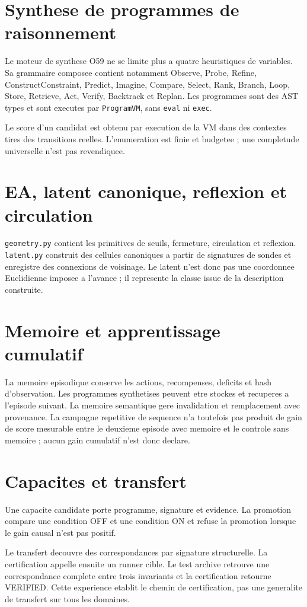 \documentclass[11pt,a4paper]{article}
\begin{document}
\section{Synthese de programmes de raisonnement}
Le moteur de synthese O59 ne se limite plus a quatre heuristiques de variables. Sa grammaire composee contient notamment Observe, Probe, Refine, ConstructConstraint, Predict, Imagine, Compare, Select, Rank, Branch, Loop, Store, Retrieve, Act, Verify, Backtrack et Replan. Les programmes sont des AST types et sont executes par \texttt{ProgramVM}, sans \texttt{eval} ni \texttt{exec}.

Le score d'un candidat est obtenu par execution de la VM dans des contextes tires des transitions reelles. L'enumeration est finie et budgetee ; une completude universelle n'est pas revendiquee.

\section{EA, latent canonique, reflexion et circulation}
\texttt{geometry.py} contient les primitives de seuils, fermeture, circulation et reflexion. \texttt{latent.py} construit des cellules canoniques a partir de signatures de sondes et enregistre des connexions de voisinage. Le latent n'est donc pas une coordonnee Euclidienne imposee a l'avance ; il represente la classe issue de la description construite.

\section{Memoire et apprentissage cumulatif}
La memoire episodique conserve les actions, recompenses, deficits et hash d'observation. Les programmes synthetises peuvent etre stockes et recuperes a l'episode suivant. La memoire semantique gere invalidation et remplacement avec provenance. La campagne repetitive de sequence n'a toutefois pas produit de gain de score mesurable entre le deuxieme episode avec memoire et le controle sans memoire ; aucun gain cumulatif n'est donc declare.

\section{Capacites et transfert}
Une capacite candidate porte programme, signature et evidence. La promotion compare une condition OFF et une condition ON et refuse la promotion lorsque le gain causal n'est pas positif.

Le transfert decouvre des correspondances par signature structurelle. La certification appelle ensuite un runner cible. Le test archive retrouve une correspondance complete entre trois invariants et la certification retourne VERIFIED. Cette experience etablit le chemin de certification, pas une generalite de transfert sur tous les domaines.
\end{document}
